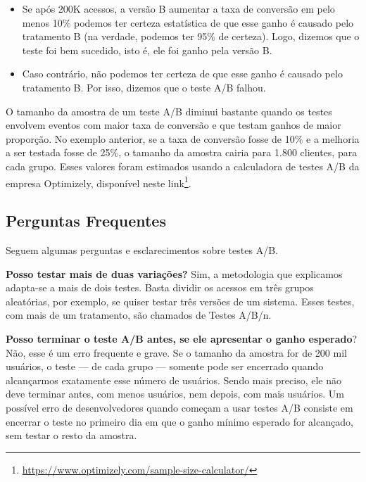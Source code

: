 \documentclass[
  11pt,
  twoside]{book}
\DeclareRobustCommand{\href}[2]{#2\footnote{\url{#1}}}
\begin{document}
\begin{itemize}
\item
  Se após 200K acessos, a versão B aumentar a taxa de conversão em pelo
  menos 10\% podemos ter certeza estatística de que esse ganho é causado
  pelo tratamento B (na verdade, podemos ter 95\% de certeza). Logo,
  dizemos que o teste foi bem sucedido, isto é, ele foi ganho pela
  versão B.
\item
  Caso contrário, não podemos ter certeza de que esse ganho é causado
  pelo tratamento B. Por isso, dizemos que o teste A/B falhou.
\end{itemize}

O tamanho da amostra de um teste A/B diminui bastante quando os testes
envolvem eventos com maior taxa de conversão e que testam ganhos de
maior proporção. No exemplo anterior, se a taxa de conversão fosse de
10\% e a melhoria a ser testada fosse de 25\%, o tamanho da amostra
cairia para 1.800 clientes, para cada grupo. Esses valores foram
estimados usando a calculadora de testes A/B da empresa Optimizely,
disponível neste
\href{https://www.optimizely.com/sample-size-calculator/}{link}.

\hypertarget{perguntas-frequentes-6}{%
\subsection{Perguntas Frequentes}\label{perguntas-frequentes-6}}

Seguem algumas perguntas e esclarecimentos sobre testes A/B.

\textbf{Posso testar mais de duas variações?} Sim, a metodologia que
explicamos adapta-se a mais de dois testes. Basta dividir os acessos em
três grupos aleatórias, por exemplo, se quiser testar três versões de um
sistema. Esses testes, com mais de um tratamento, são chamados de Testes
A/B/n.

\textbf{Posso terminar o teste A/B antes, se ele apresentar o ganho
esperado}? Não, esse é um erro frequente e grave. Se o tamanho da
amostra for de 200 mil usuários, o teste --- de cada grupo --- somente
pode ser encerrado quando alcançarmos exatamente esse número de
usuários. Sendo mais preciso, ele não deve terminar antes, com menos
usuários, nem depois, com mais usuários. Um possível erro de
desenvolvedores quando começam a usar testes A/B consiste em encerrar o
teste no primeiro dia em que o ganho mínimo esperado for alcançado, sem
testar o resto da amostra.

\end{document}
